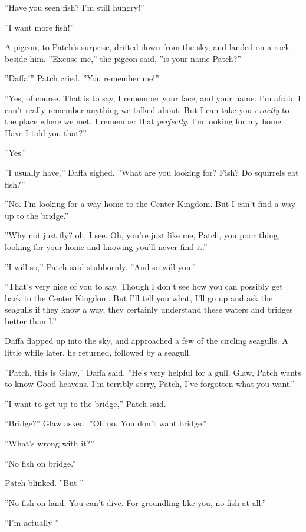 \documentclass[12pt]{book}
\begin{document}
''Have you seen fish? I'm still hungry!''

''I want more fish!''

A pigeon, to Patch's surprise, drifted down from the sky, and landed on a rock beside him. ''Excuse me,'' the pigeon said, ''is your name Patch?''

''Daffa!'' Patch cried. ''You remember me!''

''Yes, of course. That is to say, I remember your face, and your name. I'm afraid I can't really remember anything we talked about. But I can take you {\it exactly} to the place where we met, I remember that {\it perfectly}. I'm looking for my home. Have I told you that?''

''Yes.''

''I usually have,'' Daffa sighed. ''What are you looking for? Fish? Do squirrels eat fish?''

''No. I'm looking for a way home to the Center Kingdom. But I can't find a way up to the bridge.''

''Why not just fly? %
oh, I see. Oh, you're just like me, Patch, you poor thing, looking for your home and knowing you'll never find it.''

''I will so,'' Patch said stubbornly. ''And so will you.''

''That's very nice of you to say. Though I don't see how you can possibly get back to the Center Kingdom. But I'll tell you what, I'll go up and ask the seagulls if they know a way, they certainly understand these waters and bridges better than I.''

Daffa flapped up into the sky, and approached a few of the circling seagulls. A little while later, he returned, followed by a seagull.

''Patch, this is Glaw,'' Daffa said. ''He's very helpful for a gull. Glaw, Patch wants to know%
Good heavens. I'm terribly sorry, Patch, I've forgotten what you want.''

''I want to get up to the bridge,'' Patch said.

''Bridge?'' Glaw asked. ''Oh no. You don't want bridge.''

''What's wrong with it?''

''No fish on bridge.''

Patch blinked. ''But %
''

''No fish on land. You can't dive. For groundling like you, no fish at all.''

''I'm actually %
''
\end{document}
